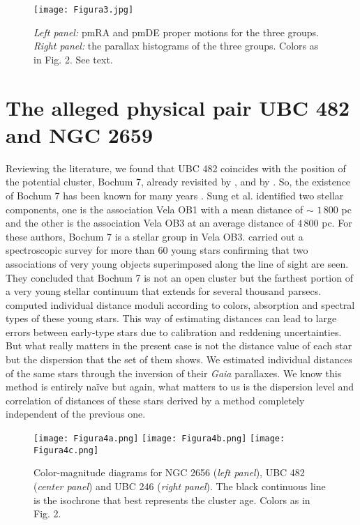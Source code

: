 \documentclass[baaa]{baaa}
\begin{document}
\begin{figure}[!t]
\centering
\texttt{[image: Figura3.jpg]}
\caption{\emph{ Left panel:} pmRA and pmDE proper motions for the three groups. \emph{ Right panel:} the parallax histograms of the three groups. Colors as in Fig. 2. See text.}
\label{Figura3}
\end{figure}


\section{ The alleged physical pair UBC 482 and NGC 2659}

Reviewing the literature, we found that UBC 482 coincides with the position of the potential cluster, Bochum 7, already revisited by \cite{Sung1999JKAS...32..109S}, \cite{Corti2003A&A...405..571C} and by \cite{Corti2007A&A...467..137C}. So, the existence of Bochum 7 has been known for many years \citep{Moffat1975A&AS...20...85M}. Sung et al. identified two stellar components, one is the association Vela OB1 with a mean distance of $\sim$ $1\,800$ pc and the other is the association Vela OB3 at an average distance of $4\,800$ pc. For these authors, Bochum 7 is a stellar group in Vela OB3. \cite{Corti2007A&A...467..137C} carried out a spectroscopic survey for more than 60 young stars confirming that two associations of very young objects superimposed along the line of sight are seen. They concluded that Bochum 7 is not an open cluster but the farthest portion of a very young stellar continuum that extends for several thousand parsecs. \cite{Corti2007A&A...467..137C} computed individual distance moduli according to colors, absorption and spectral types of these young stars. This way of estimating distances can lead to large errors between early-type stars due to calibration and reddening uncertainties. But what really matters in the present case is not the distance value of each star but the dispersion that the set of them shows. We estimated individual distances of the same stars through the inversion of their \textit{Gaia} parallaxes. We know this method is entirely naïve but again, what matters to us is the dispersion level and correlation of distances of these stars derived by a method completely independent of the previous one. 

\begin{figure*}[!t]
\centering
\texttt{[image: Figura4a.png]}
\texttt{[image: Figura4b.png]}
\texttt{[image: Figura4c.png]}
\caption{Color-magnitude diagrams for NGC 2656 (\emph{left panel}), UBC 482 (\emph{center panel}) and UBC 246 (\emph{right panel}). The black continuous line is the isochrone that best represents the cluster age. Colors as in Fig. 2.}
\label{Figura4}
\end{figure*}
\end{document}
